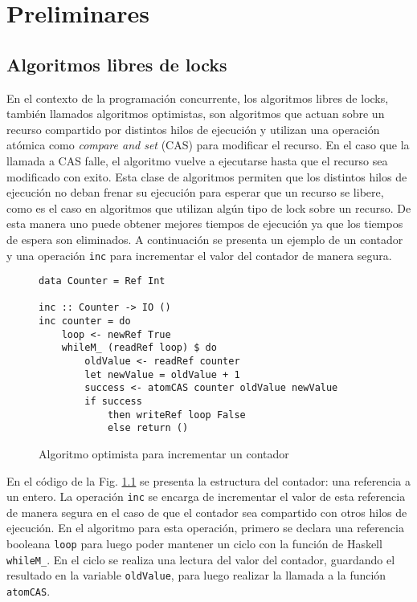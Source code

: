 \chapter{Preliminares}\label{chap:prelims}


\section{Algoritmos libres de locks}\label{sec:lockfree}
En el contexto de la programación concurrente, los algoritmos libres de locks, también llamados algoritmos optimistas, son algoritmos que actuan sobre un recurso compartido por distintos hilos de ejecución y utilizan una operación atómica como \emph{compare and set} (CAS) para modificar el recurso.
En el caso que la llamada a CAS falle, el algoritmo vuelve a ejecutarse hasta que el recurso sea modificado con exito.
Esta clase de algoritmos permiten que los distintos hilos de ejecución no deban frenar su ejecución para esperar que un recurso se libere, como es el caso en algoritmos que utilizan algún tipo de lock sobre un recurso.
De esta manera uno puede obtener mejores tiempos de ejecución ya que los tiempos de espera son eliminados.
A continuación se presenta un ejemplo de un contador y una operación \texttt{inc} para incrementar el valor del contador de manera segura.

\begin{figure}[H]
\begin{verbatim}
data Counter = Ref Int

inc :: Counter -> IO ()
inc counter = do
    loop <- newRef True
    whileM_ (readRef loop) $ do
        oldValue <- readRef counter
        let newValue = oldValue + 1
        success <- atomCAS counter oldValue newValue
        if success
            then writeRef loop False
            else return ()
\end{verbatim}
\caption{Algoritmo optimista para incrementar un contador}
\label{fig:lockfree-counter-example}
\end{figure}

En el código de la Fig. \ref{fig:lockfree-counter-example} se presenta la estructura del contador: una referencia a un entero.
La operación \texttt{inc} se encarga de incrementar el valor de esta referencia de manera segura en el caso de que el contador sea compartido con otros hilos de ejecución.
En el algoritmo para esta operación, primero se declara una referencia booleana \texttt{loop} para luego poder mantener un ciclo con la función de Haskell \texttt{whileM_}.
En el ciclo se realiza una lectura del valor del contador, guardando el resultado en la variable \texttt{oldValue}, para luego realizar la llamada a la función \texttt{atomCAS}.

